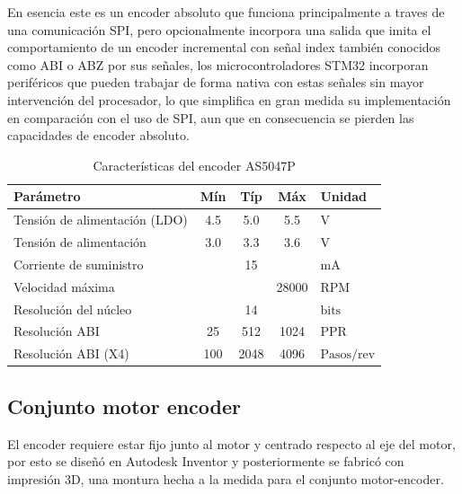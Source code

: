 \documentclass[11pt]{report}
\begin{document}
En esencia este es un encoder absoluto que funciona principalmente a traves de una comunicación SPI, pero opcionalmente incorpora una salida que imita el comportamiento de un encoder incremental con señal index también conocidos como ABI o ABZ por sus señales, los microcontroladores STM32 incorporan periféricos que pueden trabajar de forma nativa con estas señales sin mayor intervención del procesador, lo que simplifica en gran medida su implementación en comparación con el uso de SPI, aun que en consecuencia se pierden las capacidades de encoder absoluto.

\begin{table}[h!]
	\centering
	\caption{Características del encoder AS5047P}
	\begin{tabular}{l c c c l}
		\hline
		\textbf{Parámetro}            & \textbf{Mín} & \textbf{Típ} & \textbf{Máx} & \textbf{Unidad}      \\
		\hline
		Tensión de alimentación (LDO) & 4.5          & 5.0          & 5.5          & $\mathrm{V}$         \\
		Tensión de alimentación       & 3.0          & 3.3          & 3.6          & $\mathrm{V}$         \\
		Corriente de suministro       &              & 15           &              & $\mathrm{mA}$        \\
		Velocidad máxima              &              &              & 28000        & $\mathrm{RPM}$       \\
		Resolución del núcleo         &              & 14           &              & $\mathrm{bits}$      \\
		Resolución ABI                & 25           & 512          & 1024         & $\mathrm{PPR}$       \\
		Resolución ABI (X4)           & 100          & 2048         & 4096         & $\mathrm{Pasos/rev}$ \\
		\hline
	\end{tabular}
\end{table}
\FloatBarrier

\newpage
\subsection{Conjunto motor encoder}
El encoder requiere estar fijo junto al motor y centrado respecto al eje del motor, por esto se diseñó en Autodesk Inventor y posteriormente se fabricó con impresión 3D, una montura hecha a la medida para el conjunto motor-encoder.
\end{document}
